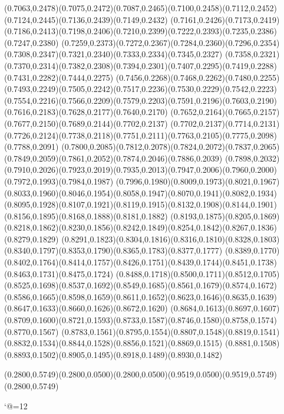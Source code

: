 (0.7063,0.2478)(0.7075,0.2472)(0.7087,0.2465)(0.7100,0.2458)(0.7112,0.2452)(0.7124,0.2445)(0.7136,0.2439)(0.7149,0.2432)
(0.7161,0.2426)(0.7173,0.2419)(0.7186,0.2413)(0.7198,0.2406)(0.7210,0.2399)(0.7222,0.2393)(0.7235,0.2386)(0.7247,0.2380)
(0.7259,0.2373)(0.7272,0.2367)(0.7284,0.2360)(0.7296,0.2354)(0.7308,0.2347)(0.7321,0.2340)(0.7333,0.2334)(0.7345,0.2327)
(0.7358,0.2321)(0.7370,0.2314)(0.7382,0.2308)(0.7394,0.2301)(0.7407,0.2295)(0.7419,0.2288)(0.7431,0.2282)(0.7444,0.2275)
(0.7456,0.2268)(0.7468,0.2262)(0.7480,0.2255)(0.7493,0.2249)(0.7505,0.2242)(0.7517,0.2236)(0.7530,0.2229)(0.7542,0.2223)
(0.7554,0.2216)(0.7566,0.2209)(0.7579,0.2203)(0.7591,0.2196)(0.7603,0.2190)(0.7616,0.2183)(0.7628,0.2177)(0.7640,0.2170)
(0.7652,0.2164)(0.7665,0.2157)(0.7677,0.2150)(0.7689,0.2144)(0.7702,0.2137)
\PST@Solid(0.7702,0.2137)(0.7714,0.2131)(0.7726,0.2124)(0.7738,0.2118)(0.7751,0.2111)(0.7763,0.2105)(0.7775,0.2098)(0.7788,0.2091)
(0.7800,0.2085)(0.7812,0.2078)(0.7824,0.2072)(0.7837,0.2065)(0.7849,0.2059)(0.7861,0.2052)(0.7874,0.2046)(0.7886,0.2039)
(0.7898,0.2032)(0.7910,0.2026)(0.7923,0.2019)(0.7935,0.2013)(0.7947,0.2006)(0.7960,0.2000)(0.7972,0.1993)(0.7984,0.1987)
(0.7996,0.1980)(0.8009,0.1973)(0.8021,0.1967)(0.8033,0.1960)(0.8046,0.1954)(0.8058,0.1947)(0.8070,0.1941)(0.8082,0.1934)
(0.8095,0.1928)(0.8107,0.1921)(0.8119,0.1915)(0.8132,0.1908)(0.8144,0.1901)(0.8156,0.1895)(0.8168,0.1888)(0.8181,0.1882)
(0.8193,0.1875)(0.8205,0.1869)(0.8218,0.1862)(0.8230,0.1856)(0.8242,0.1849)(0.8254,0.1842)(0.8267,0.1836)(0.8279,0.1829)
(0.8291,0.1823)(0.8304,0.1816)(0.8316,0.1810)(0.8328,0.1803)(0.8340,0.1797)(0.8353,0.1790)(0.8365,0.1783)(0.8377,0.1777)
(0.8389,0.1770)(0.8402,0.1764)(0.8414,0.1757)(0.8426,0.1751)(0.8439,0.1744)(0.8451,0.1738)(0.8463,0.1731)(0.8475,0.1724)
(0.8488,0.1718)(0.8500,0.1711)(0.8512,0.1705)(0.8525,0.1698)(0.8537,0.1692)(0.8549,0.1685)(0.8561,0.1679)(0.8574,0.1672)
(0.8586,0.1665)(0.8598,0.1659)(0.8611,0.1652)(0.8623,0.1646)(0.8635,0.1639)(0.8647,0.1633)(0.8660,0.1626)(0.8672,0.1620)
(0.8684,0.1613)(0.8697,0.1607)(0.8709,0.1600)(0.8721,0.1593)(0.8733,0.1587)(0.8746,0.1580)(0.8758,0.1574)(0.8770,0.1567)
(0.8783,0.1561)(0.8795,0.1554)(0.8807,0.1548)(0.8819,0.1541)(0.8832,0.1534)(0.8844,0.1528)(0.8856,0.1521)(0.8869,0.1515)
(0.8881,0.1508)(0.8893,0.1502)(0.8905,0.1495)(0.8918,0.1489)(0.8930,0.1482)



\PST@Solid(0.2800,0.5749)(0.2800,0.0500)\PST@Solid(0.2800,0.0500)(0.9519,0.0500)(0.9519,0.5749)(0.2800,0.5749)

\catcode`@=12
\fi
\endpspicture

